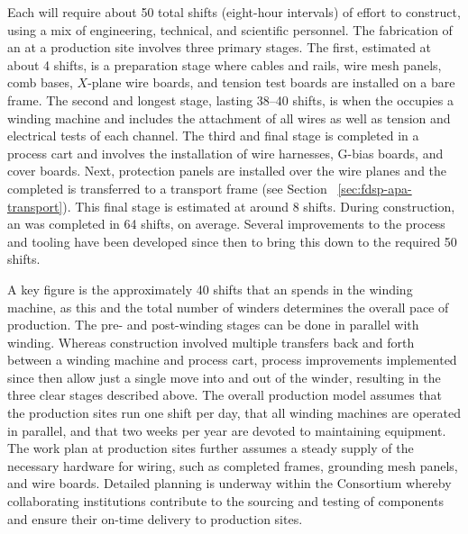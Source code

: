 Each  will require about \num{50} total shifts (eight-hour intervals) of effort to construct, using a mix of engineering, technical, and scientific personnel.  The fabrication of an  at a production site involves three primary stages. The first, estimated at about \num{4} shifts, is a preparation stage where  cables and rails, wire mesh panels, comb bases, $X$-plane wire boards, and tension test boards are installed on a bare  frame. The second and longest stage, lasting \num{38}--\num{40} shifts, is when the  occupies a winding machine and includes the attachment of all wires as well as tension and electrical tests of each channel.  The third and final stage is completed in a process cart and involves the installation of wire harnesses, G-bias boards, and cover boards. %
Next, protection panels are installed over the wire planes and the completed  is transferred to a transport frame (see Section ~\ref{sec:fdsp-apa-transport}). This final stage is estimated at around \num{8} shifts.   During  construction, an  was completed in \num{64} shifts, on average. Several improvements to the process and tooling have been developed since then to bring this down to the required \num{50} shifts. 

A key figure is the approximately \num{40} shifts that an  spends in the winding machine, as this and the total number of winders determines the overall pace of production. The pre- and post-winding stages can be done in parallel with winding.  Whereas  construction involved multiple transfers back and forth between a winding machine and process cart, process improvements implemented since then allow just a single move into and out of the winder, resulting in the three clear stages described above.  The overall production model assumes that the  production sites run one shift per day, that all winding machines are operated in parallel, and that two weeks per year are devoted to maintaining equipment.  The work plan at production sites further assumes a steady supply of the necessary hardware for  wiring, such as completed frames, grounding mesh panels, and wire boards.  Detailed planning is underway within the   Consortium whereby collaborating institutions contribute to the sourcing and testing of components and ensure their on-time delivery to production sites.        

